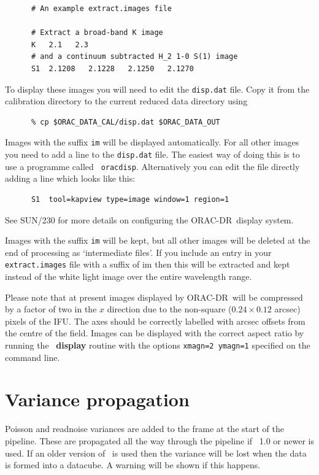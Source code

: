 \documentclass[twoside,11pt]{article}
\newcommand{\xref}[3]{#1}
\renewcommand{\_}{\texttt{\symbol{95}}}
\newcommand{\KAPPA}{\xref{{\sc{Kappa}}}{sun95}{}}
\newcommand{\ORACDR}{{\footnotesize ORAC-DR}}
\begin{document}
\begin{verbatim}
      # An example extract.images file

      # Extract a broad-band K image
      K   2.1   2.3
      # and a continuum subtracted H_2 1-0 S(1) image
      S1  2.1208   2.1228   2.1250   2.1270
\end{verbatim}

To display these images you will need to edit the {\tt disp.dat} file.
Copy it from the calibration directory to the current reduced data
directory using

\begin{verbatim}
      % cp $ORAC_DATA_CAL/disp.dat $ORAC_DATA_OUT
\end{verbatim}

Images with the suffix {\tt \_im} will be displayed automatically. For
all other images you need to add a line to the {\tt disp.dat} file.
The easiest way of doing this is to use a programme called {\tt
  oracdisp}. Alternatively you can edit the file directly adding a
line which looks like this:

\begin{verbatim}
      S1  tool=kapview type=image window=1 region=1
\end{verbatim}

See \xref{SUN/230}{sun230}{} for more details on configuring the
\ORACDR\ display system.

Images with the suffix {\tt \_im} will be kept, but all other images
will be deleted at the end of processing as `intermediate files'. If
you include an entry in your {\tt extract.images} file with a suffix
of {im} then this will be extracted and kept instead of the white
light image over the entire wavelength range.

Please note that at present images displayed by \ORACDR\ will be
compressed by a factor of two in the $x$ direction due to the
non-square ($0.24 \times 0.12$ arcsec) pixels of the IFU. The axes
should be correctly labelled with arcsec offsets from the centre of
the field. Images can be displayed with the correct aspect ratio by
running the \KAPPA\ \xref{{\bf display}}{sun95}{DISPLAY} routine with
the options {\tt xmagn=2 ymagn=1} specified on the command line.


\section{Variance propagation}

Poisson and readnoise variances are added to the frame at the start of
the pipeline. These are propagated all the way through the pipeline if
\KAPPA\ 1.0 or newer is used. If an older version of \KAPPA\ is used
then the variance will be lost when the data is formed into a
datacube. A warning will be shown if this happens.
\end{document}
